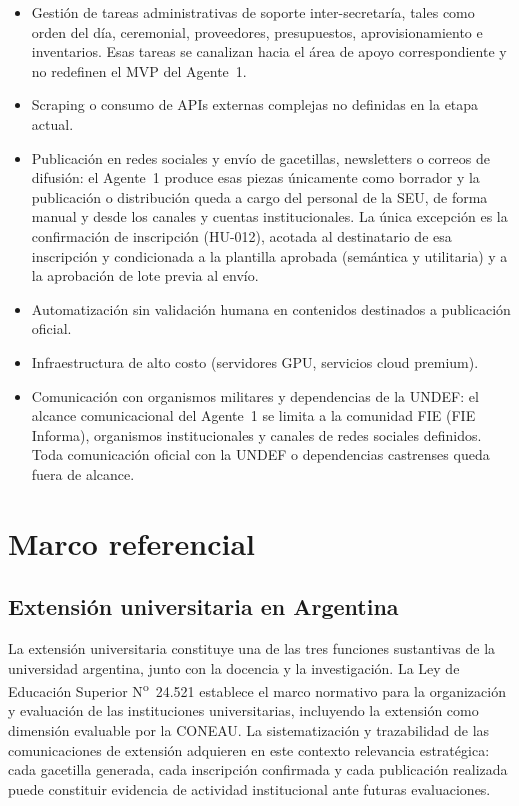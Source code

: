 \documentclass[a4paper, 12pt]{article}
\begin{document}
\begin{itemize}
  \item Gesti\'on de tareas administrativas de soporte inter-secretar\'ia, tales como orden del d\'ia, ceremonial, proveedores, presupuestos, aprovisionamiento e inventarios. Esas tareas se canalizan hacia el \'area de apoyo correspondiente y no redefinen el \ac{MVP} del Agente~1.
  \item Scraping o consumo de APIs externas complejas no definidas en la etapa actual.
  \item Publicaci\'on en redes sociales y env\'io de gacetillas, newsletters o correos de difusi\'on: el Agente~1 produce esas piezas \'unicamente como borrador y la publicaci\'on o distribuci\'on queda a cargo del personal de la \ac{SEU}, de forma manual y desde los canales y cuentas institucionales. La \'unica excepci\'on es la confirmaci\'on de inscripci\'on (HU-012), acotada al destinatario de esa inscripci\'on y condicionada a la plantilla aprobada (sem\'antica y utilitaria) y a la aprobaci\'on de lote previa al env\'io.
  \item Automatizaci\'on sin validaci\'on humana en contenidos destinados a publicaci\'on oficial.
  \item Infraestructura de alto costo (servidores GPU, servicios cloud premium).
  \item Comunicaci\'on con organismos militares y dependencias de la \ac{UNDEF}: el alcance comunicacional del Agente~1 se limita a la comunidad \ac{FIE} (FIE Informa), organismos institucionales y canales de redes sociales definidos. Toda comunicaci\'on oficial con la \ac{UNDEF} o dependencias castrenses queda fuera de alcance.
\end{itemize}

\section{Marco referencial}

\subsection{Extensi\'on universitaria en Argentina}

La extensi\'on universitaria constituye una de las tres funciones sustantivas de la universidad argentina, junto con la docencia y la investigaci\'on. La Ley de Educaci\'on Superior N\textsuperscript{o}~24.521 \parencite{ley24521} establece el marco normativo para la organizaci\'on y evaluaci\'on de las instituciones universitarias, incluyendo la extensi\'on como dimensi\'on evaluable por la \ac{CONEAU}. La sistematizaci\'on y trazabilidad de las comunicaciones de extensi\'on adquieren en este contexto relevancia estrat\'egica: cada gacetilla generada, cada inscripci\'on confirmada y cada publicaci\'on realizada puede constituir evidencia de actividad institucional ante futuras evaluaciones.
\end{document}
